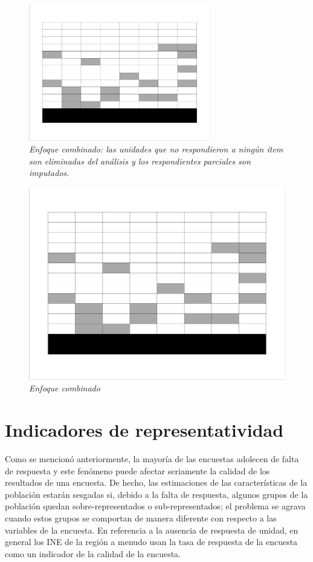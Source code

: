 \documentclass[
  10pt,
  spanish,
]{book}
\begin{document}
\begin{figure}
\centering
\includegraphics[width=3.125in,height=\textheight]{Pics/j5.png}
\caption{\emph{Enfoque combinado: las unidades que no respondieron a ningún ítem son eliminadas del análisis y los respondientes parciales son imputados.}}
\end{figure}

\begin{figure}
\centering
\includegraphics{Pics/nr5.png}
\caption{\emph{Enfoque combinado}}
\end{figure}

\hypertarget{indicadores-de-representatividad}{%
\section{Indicadores de representatividad}\label{indicadores-de-representatividad}}

Como se mencionó anteriormente, la mayoría de las encuestas adolecen de falta de respuesta y este fenómeno puede afectar seriamente la calidad de
los resultados de una encuesta. De hecho, las estimaciones de las características de la población estarán sesgadas si, debido a la falta de respuesta, algunos grupos de la población quedan sobre-representados o sub-representados; el problema se agrava cuando estos grupos
se comportan de manera diferente con respecto a las variables de la
encuesta. En referencia a la ausencia de respuesta de unidad, en general los INE de la región a menudo usan la tasa de respuesta de la encuesta como un indicador de la calidad de la encuesta.
\end{document}
